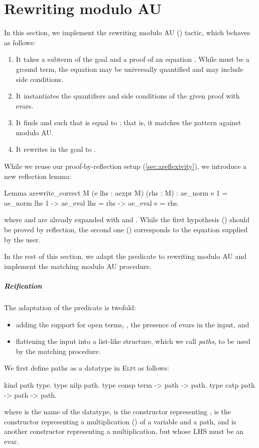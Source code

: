 \documentclass[a4paper,UKenglish,cleveref,autoref]{lipics-v2021}
\newcommand\evar[1]{\ensuremath{?_{\texttt{#1}}}}
\newcommand{\Elpi}{{\sffamily\scshape Elpi}\xspace}
\begin{document}
\section{Rewriting modulo AU}
\label{sec:arewrite}

In this section, we implement the rewriting modulo AU () tactic, which behaves as
follows:
\begin{enumerate}
\item It takes a subterm  of the goal and a proof of an equation .
  While  must be a ground term, the equation may be universally quantified and may include
  side conditions.
\item It instantiates the quantifiers and side conditions of the given proof with evars.
\item It finds  and  such that  is equal to ;
  that is, it matches the pattern \rocq{#$\evar{pre}$# * lhs * #$\evar{post}$#} against 
  modulo AU.
\item It rewrites  in the goal to .
\end{enumerate}
While we reuse our proof-by-reflection setup (\cref{sec:areflexivity}), we introduce a new
reflection lemma:
\begin{rocqcode}
Lemma arewrite_correct {M} (e lhs : aexpr M) (rhs : M) :
  ae_norm e 1 = ae_norm lhs 1 -> ae_eval lhs = rhs -> ae_eval e = rhs.
\end{rocqcode}
where  and  are already expanded with  and .
While the first hypothesis () should be proved by reflection, the
second one () corresponds to the equation supplied by the user.

In the rest of this section, we adapt the  predicate to rewriting modulo AU and
implement the matching modulo AU procedure.

\subparagraph{Reification}
The adaptation of the  predicate is twofold:
\begin{itemize}
\item adding the support for open terms, \ie, the presence of evars in the input, and
\item flattening the input into a list-like structure, which we call \emph{paths}, to be used by the
  matching procedure.
\end{itemize}
We first define paths as a datatype in \Elpi as follows:
\begin{elpicode}
kind path type.
type nilp path.
type consp term -> path -> path.
type catp path -> path -> path.
\end{elpicode}
where  is the name of the datatype,  is the constructor representing
,  is the constructor representing a multiplication () of a variable
and a path, and  is another constructor representing a multiplication, but whose LHS must
be an evar.
\end{document}
